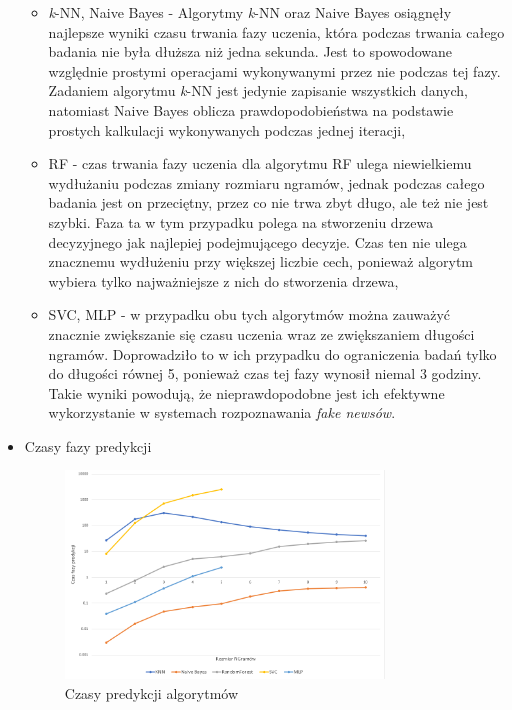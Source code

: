 \begin{itemize}
    \begin{itemize}
        \item \textit{k}-NN, Naive Bayes -
        Algorytmy \textit{k}-NN oraz Naive Bayes osiągnęły najlepsze wyniki czasu trwania fazy uczenia, która podczas 
        trwania całego badania nie była dłuższa niż jedna sekunda.
        Jest to spowodowane względnie prostymi operacjami wykonywanymi przez nie podczas tej fazy. 
        Zadaniem algorytmu \textit{k}-NN jest jedynie zapisanie wszystkich danych, natomiast Naive Bayes  
        oblicza prawdopodobieństwa na podstawie prostych kalkulacji wykonywanych podczas jednej iteracji,
        \item RF -
        czas trwania fazy uczenia dla algorytmu RF ulega niewielkiemu wydłużaniu podczas zmiany rozmiaru 
        ngramów, jednak podczas całego badania jest on przeciętny, przez co nie trwa zbyt długo, ale też nie jest szybki.
        Faza ta w tym przypadku polega na stworzeniu drzewa decyzyjnego jak najlepiej podejmującego decyzje. Czas ten nie
        ulega znacznemu wydłużeniu przy większej liczbie cech, ponieważ algorytm wybiera tylko najważniejsze z nich do stworzenia 
        drzewa,
        \item SVC, MLP -
        w przypadku obu tych algorytmów można zauważyć znacznie zwiększanie się czasu uczenia wraz ze zwiększaniem
        długości ngramów. Doprowadziło to w ich przypadku do ograniczenia badań tylko do długości równej 5,
        ponieważ czas tej fazy wynosił niemal 3 godziny. Takie wyniki powodują, że nieprawdopodobne jest 
        ich efektywne wykorzystanie w systemach rozpoznawania \textit{fake newsów}. 
    \end{itemize}
    \item Czasy fazy predykcji
    \begin{figure}[h!]
        \centering
        \includegraphics[width=0.8\textwidth]{./Img/BOWPredict.png}
        \caption{Czasy predykcji algorytmów}
    \end{figure}
    

\end{itemize}
